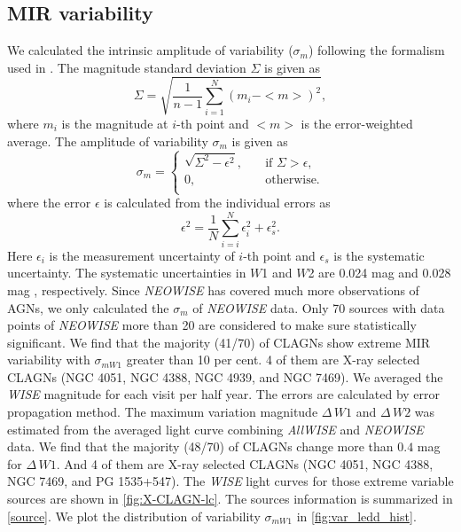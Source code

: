 \documentclass[linenumbers]{aastex631}
\begin{document}
\subsection{MIR variability}
 We calculated the intrinsic amplitude of variability ($\sigma_m$) following the formalism used in \citet{2019MNRAS.483.2362R} \citep[see also][etc]{2007AJ....134.2236S,2012ApJ...759L..31J}.
The magnitude standard deviation $\Sigma$ is given as
\begin{equation}
\Sigma=\sqrt{\frac{1}{n-1}\sum_{i=1}^{N}(m_i - <m>)^2},
\end{equation}
where $m_i$ is the magnitude at $i$-th point and $<m>$ is the error-weighted average.
The amplitude of variability $\sigma_m$ is given as  
\[\sigma_m  =
  \begin{cases}
    \sqrt{\Sigma^2 - \epsilon^2},  & \quad \text{if } \Sigma>\epsilon,\\
     0,                            & \quad  \text{otherwise.}\\
  \end{cases}
\]	               
where the error $\epsilon$ is calculated from the individual errors as
\begin{equation}
\epsilon^2=\frac{1}{N}\sum_{i=i}^{N}{\epsilon_{i}^{2} + \epsilon_{s}^2}. 
\end{equation}
Here $\epsilon_{i}$ is the measurement uncertainty of $i$-th point and $\epsilon_{s}$ is the systematic uncertainty.
The systematic uncertainties in $W$1 and $W$2 are 0.024 mag and 0.028 mag \citep{2011ApJ...735..112J}, respectively. Since \textit{NEOWISE} has covered much more observations of AGNs, we only calculated the $\sigma_m$ of \textit{NEOWISE} data.
Only 70 sources with data points of \textit{NEOWISE} more than 20 are considered to make sure statistically significant. We find that the majority (41/70) of CLAGNs show extreme MIR variability with $\sigma_{m W1}$ greater than 10 per cent. 4 of them are X-ray selected CLAGNs (NGC 4051, NGC 4388, NGC 4939, and NGC 7469). We averaged the {\it WISE} magnitude for each visit per half year. The errors are calculated by error propagation method. The maximum variation magnitude $\Delta\,W1$ and $\Delta\,W2$ was estimated from the averaged light curve combining \textit{AllWISE} and \textit{NEOWISE} data. We find that the majority (48/70) of CLAGNs change more than $0.4$ mag for $\Delta\,W1$. And 4 of them are X-ray selected CLAGNs (NGC 4051, NGC 4388, NGC 7469, and PG 1535+547). The {\it WISE} light curves for those extreme variable sources are shown in \autoref{fig:X-CLAGN-lc}. The sources information is summarized in \autoref{source}.  We plot the distribution of variability $\sigma_{m W1}$ in \autoref{fig:var_ledd_hist}.
\end{document}
